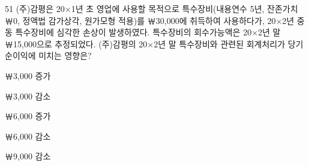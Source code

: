 \begin{question}{51}
(주)감평은 20×1년 초 영업에 사용할 목적으로 특수장비(내용연수 5년, 잔존가치 ￦0, 정액법 감가상각, 원가모형 적용)를 ￦30,000에 취득하여 사용하다가, 20×2년 중 동 특수장비에 심각한 손상이 발생하였다. 특수장비의 회수가능액은 20×2년 말 ￦15,000으로 추정되었다. (주)감평의 20×2년 말 특수장비와 관련된 회계처리가 당기 순이익에 미치는 영향은?
\begin{choices}
  \item ￦3,000 증가
  \item ￦3,000 감소
  \item ￦6,000 증가
  \item ￦6,000 감소
  \item ￦9,000 감소
\end{choices}
\end{question}
